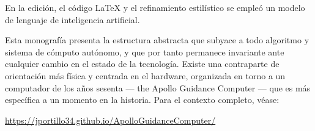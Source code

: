 \documentclass[12pt,openany]{book}
\theoremstyle{definition}
\begin{document}
\medskip

En la edición, el código \LaTeX{} y el refinamiento estilístico se empleó un
modelo de lenguaje de inteligencia artificial.

\medskip

Esta monografía presenta la estructura abstracta que subyace a todo algoritmo
y sistema de cómputo autónomo, y que por tanto permanece invariante ante
cualquier cambio en el estado de la tecnología.
Existe una contraparte de orientación más física y centrada en el hardware,
organizada en torno a un computador de los años sesenta --- the Apollo Guidance Computer --- que es más específica a un momento en la historia.
Para el contexto completo, véase:

\medskip

{\small
\url{https://jportillo34.github.io/ApolloGuidanceComputer/}
}

\clearpage

\makeatletter
\@mainmattertrue
\makeatother
{}






\backmatter
\clearpage
{}
{}
\end{document}
